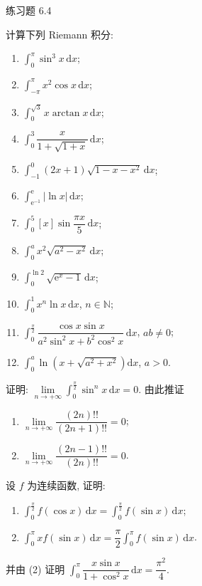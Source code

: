 \begin{exblock}{练习题 6.4}
  \item 计算下列 Riemann 积分:
  \begin{enumerate}[label=(\arabic*)]
    \item $\int_{0}^{\pi}\sin^{3}x\,\mathrm{d}x$;
    \item $\int_{-\pi}^{\pi}x^{2}\cos x\,\mathrm{d}x$;
    \item $\int_{0}^{\sqrt{3}}x\arctan x\,\mathrm{d}x$;
    \item $\int_{0}^{3}\dfrac{x}{1+\sqrt{1+x}}\,\mathrm{d}x$;
    \item $\int_{-1}^{0}(2x+1)\sqrt{1-x-x^{2}}\,\mathrm{d}x$;
    \item $\int_{\mathrm{e}^{-1}}^{\mathrm{e}}|\ln x|\,\mathrm{d}x$;
    \item $\int_{0}^{5}[x]\sin\dfrac{\pi x}{5}\,\mathrm{d}x$;
    \item $\int_{0}^{a}x^{2}\sqrt{a^{2}-x^{2}}\,\mathrm{d}x$;
    \item $\int_{0}^{\ln2}\sqrt{\mathrm{e}^{x}-1}\,\mathrm{d}x$;
    \item $\int_{0}^{1}x^{n}\ln x\,\mathrm{d}x$, $n\in\mathbb{N}$;
    \item $\int_{0}^{\frac{\pi}{2}}\dfrac{\cos x\sin x}{a^{2}\sin^{2}x+b^{2}\cos^{2}x}\,\mathrm{d}x$, $ab\neq0$;
    \item $\int_{0}^{a}\ln\left(x+\sqrt{a^{2}+x^{2}}\right)\mathrm{d}x$, $a>0$.
  \end{enumerate}

  \item 证明: $\lim\limits_{n\to+\infty}\int_{0}^{\frac{\pi}{2}}\sin^{n}x\,\mathrm{d}x=0$. 由此推证
  \begin{enumerate}[label=(\arabic*)]
    \item $\lim\limits_{n\to+\infty}\dfrac{(2n)!!}{(2n+1)!!}=0$;
    \item $\lim\limits_{n\to+\infty}\dfrac{(2n-1)!!}{(2n)!!}=0$.
  \end{enumerate}

  \item 设 $f$ 为连续函数, 证明:
  \begin{enumerate}[label=(\arabic*)]
    \item $\int_{0}^{\frac{\pi}{2}}f(\cos x)\,\mathrm{d}x=\int_{0}^{\frac{\pi}{2}}f(\sin x)\,\mathrm{d}x$;
    \item $\int_{0}^{\pi}xf(\sin x)\,\mathrm{d}x=\dfrac{\pi}{2}\int_{0}^{\pi}f(\sin x)\,\mathrm{d}x$.
  \end{enumerate}
  并由 (2) 证明 $\int_{0}^{\pi}\dfrac{x\sin x}{1+\cos^{2}x}\,\mathrm{d}x=\dfrac{\pi^{2}}{4}$.


\end{exblock}
